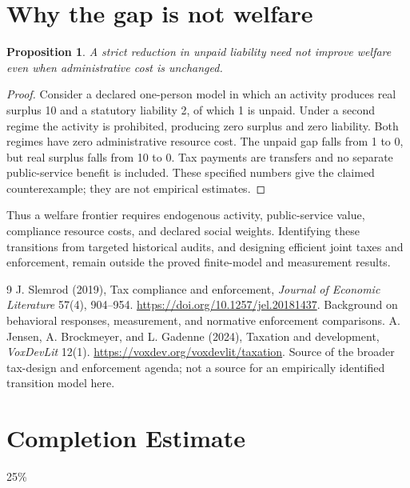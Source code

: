 \documentclass[11pt,a4paper]{article}
\newtheorem{proposition}[theorem]{Proposition}
\theoremstyle{definition}
\theoremstyle{remark}
\begin{document}
\section{Why the gap is not welfare}
\begin{proposition}
A strict reduction in unpaid liability need not improve welfare even when administrative cost is unchanged.
\end{proposition}
\begin{proof}
Consider a declared one-person model in which an activity produces real surplus 10 and a statutory liability 2, of which 1 is unpaid. Under a second regime the activity is prohibited, producing zero surplus and zero liability. Both regimes have zero administrative resource cost. The unpaid gap falls from 1 to 0, but real surplus falls from 10 to 0. Tax payments are transfers and no separate public-service benefit is included. These specified numbers give the claimed counterexample; they are not empirical estimates.
\end{proof}
Thus a welfare frontier requires endogenous activity, public-service value, compliance resource costs, and declared social weights. Identifying these transitions from targeted historical audits, and designing efficient joint taxes and enforcement, remain outside the proved finite-model and measurement results.
\begin{thebibliography}{9}
 J. Slemrod (2019), Tax compliance and enforcement, \emph{Journal of Economic Literature} 57(4), 904--954. \url{https://doi.org/10.1257/jel.20181437}. Background on behavioral responses, measurement, and normative enforcement comparisons.
 A. Jensen, A. Brockmeyer, and L. Gadenne (2024), Taxation and development, \emph{VoxDevLit} 12(1). \url{https://voxdev.org/voxdevlit/taxation}. Source of the broader tax-design and enforcement agenda; not a source for an empirically identified transition model here.
\end{thebibliography}

\section{Completion Estimate}
25\%
\end{document}
